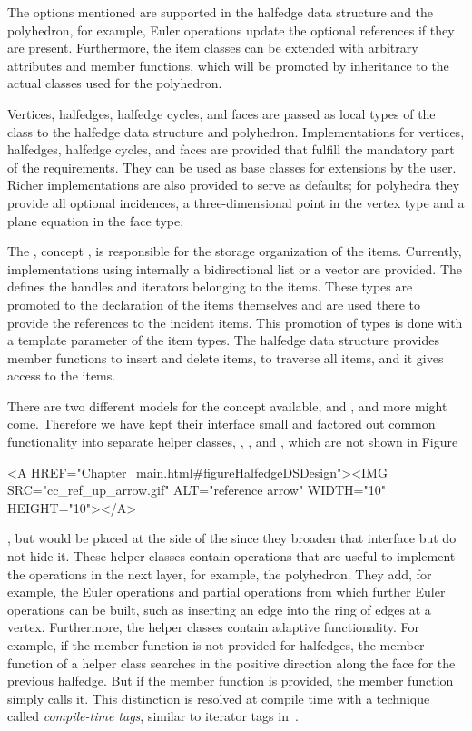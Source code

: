 The options mentioned are supported in the halfedge data structure and the
polyhedron, for example, Euler operations update the optional
references if they are present. Furthermore, the item classes can be
extended with arbitrary attributes and member functions, which will be
promoted by inheritance to the actual classes used for the polyhedron.


Vertices, halfedges, halfedge cycles, and faces are passed as local types of the
 class to the halfedge data structure and polyhedron.
Implementations for vertices, halfedges, halfedge cycles, and faces are provided that
fulfill the mandatory part of the requirements. They can be used as
base classes for extensions by the user. Richer implementations are
also provided to serve as defaults; for polyhedra they provide all
optional incidences, a three-dimensional point in the vertex type and
a plane equation in the face type.

The , concept , is
responsible for the storage organization of the items. Currently,
implementations using internally a bidirectional list or a
vector are provided. The  defines the handles and iterators
belonging to the items. These types are promoted to the declaration of
the items themselves and are used there to provide the references to
the incident items. This promotion of types is done with a template
parameter  of the item types.  The halfedge data structure
provides member functions to insert and delete items, to traverse all
items, and it gives access to the items.

There are two different models for the  concept available,
 and , and more might come.
Therefore we have kept their interface small and factored out common
functionality into separate helper classes, ,
, and ,
which are not shown in
Figure~\ccTexHtml{\ref{figureHalfedgeDSDesign}}{}\begin{ccHtmlOnly} <A
HREF="Chapter_main.html#figureHalfedgeDSDesign"><IMG
SRC="cc_ref_up_arrow.gif" ALT="reference arrow" WIDTH="10"
HEIGHT="10"></A>
\end{ccHtmlOnly}, but would be placed at the side of the 
since they broaden that interface but do not hide it.  These helper
classes contain operations that are useful to implement the operations
in the next layer, for example, the polyhedron. They add, for example,
the Euler operations and partial operations from which further Euler
operations can be built, such as inserting an edge into the ring of
edges at a vertex.  Furthermore, the helper classes contain adaptive
functionality.  For example, if the  member function is
not provided for halfedges, the  member function of
a helper class searches in the positive direction along the face for
the previous halfedge. But if the  member function is
provided, the  member function simply calls it. This
distinction is resolved at compile time with a technique called {\em
compile-time tags}, similar to iterator tags in~\cite{cgal:sl-stl-95}.

